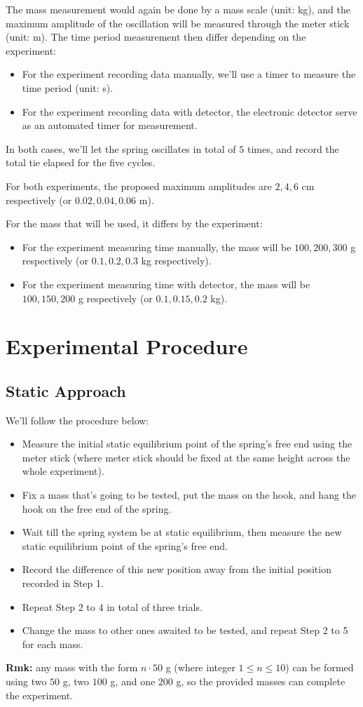 \documentclass{article}
\begin{document}
The mass measurement would again be done by a mass scale (unit: kg), and the maximum amplitude of the oscillation will be measured through the meter stick (unit: m). The time period measurement then differ depending on the experiment:
\begin{itemize}
    \item For the experiment recording data manually, we'll use a timer to measure the time period (unit: s).
    \item For the experiment recording data with detector, the electronic detector serve as an automated timer for measurement.
\end{itemize}
In both cases, we'll let the spring oscillates in total of $5$ times, and record the total tie elapsed for the five cycles.

\hfil

For both experiments, the proposed maximum amplitudes are $2,4,6$ cm respectively (or $0.02,0.04,0.06$ m).

For the mass that will be used, it differs by the experiment:
\begin{itemize}
    \item For the experiment measuring time manually, the mass will be $100,200,300$ g respectively (or $0.1,0.2,0.3$ kg respectively).
    \item For the experiment measuring time with detector, the mass will be $100,150,200$ g respectively (or $0.1,0.15,0.2$ kg).
\end{itemize}

\section{Experimental Procedure}
\subsection{Static Approach}
We'll follow the procedure below:
\begin{itemize}
    \item[1.] Measure the initial static equilibrium point of the spring's free end using the meter stick (where meter stick should be fixed at the same height across the whole experiment).
    \item[2.] Fix a mass that's going to be tested, put the mass on the hook, and hang the hook on the free end of the spring.
    \item[3.] Wait till the spring system be at static equilibrium, then measure the new static equilibrium point of the spring's free end.
    \item[4.] Record the difference of this new position away from the initial position recorded in Step 1. 
    \item[5.] Repeat Step 2 to 4 in total of three trials.
    \item[6.] Change the mass to other ones awaited to be tested, and repeat Step 2 to 5 for each mass.  
\end{itemize}
\textbf{Rmk:} any mass with the form $n\cdot 50$ g (where integer $1\leq n\leq 10$) can be formed using two $50$ g, two $100$ g, and one $200$ g, so the provided masses can complete the experiment.
\end{document}
